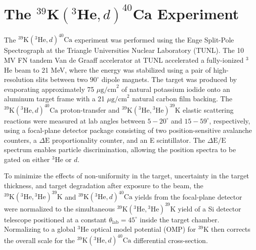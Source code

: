 \section{The $^{39}\mathrm{\textbf{K}}(^{3}\mathrm{\textbf{He}},d)^{40}\mathrm{\textbf{Ca}}$ Experiment}










The $^{39}\mathrm{K}(^{3}\mathrm{He}, d)^{40}\mathrm{Ca}$ experiment was performed using the Enge Split-Pole Spectrograph at the Triangle Universities Nuclear Laboratory (TUNL). The 10 MV FN tandem Van de Graaff accelerator at TUNL accelerated a fully-ionized $^{3}$He beam to 21 MeV, where the energy was stabilized using a pair of high-resolution slits between two $90^{\circ}$ dipole magnets. The target was produced by evaporating approximately 75 $\mu\mathrm{g/cm}^{2}$ of natural potassium iodide onto an aluminum target frame with a 21 $\mu\mathrm{g/cm}^{2}$ natural carbon film backing. The $^{39}\mathrm{K}(^{3}\mathrm{He}, d)^{40}\mathrm{Ca}$ proton-transfer and $^{39}\mathrm{K}(^{3}\mathrm{He}, {}^{3}\mathrm{He})^{39}\mathrm{K}$ elastic scattering reactions were measured at lab angles between $5-20^{\circ}$ and $15-59^{\circ}$, respectively, using a focal-plane detector package \cite{Marshall2019} consisting of two position-sensitive avalanche counters, a $\Delta\mathrm{E}$ proportionality counter, and an E scintillator. The $\Delta\mathrm{E}/\mathrm{E}$ spectrum enables particle discrimination, allowing the position spectra to be gated on either $^{3}\mathrm{He}$ or $d$.

To minimize the effects of non-uniformity in the target, uncertainty in the target thickness, and target degradation after exposure to the beam, the $^{39}\mathrm{K}(^{3}\mathrm{He}, {}^{3}\mathrm{He})^{39}\mathrm{K}$ and $^{39}\mathrm{K}(^{3}\mathrm{He}, d)^{40}\mathrm{Ca}$ yields from the focal-plane detector were normalized to the simultaneous $^{39}\mathrm{K}(^{3}\mathrm{He}, {}^{3}\mathrm{He})^{39}\mathrm{K}$ yield of a Si detector telescope positioned at a constant $\theta_{\mathrm{lab}} = 45^{\circ}$ inside the target chamber. Normalizing to a global $^{3}\mathrm{He}$ optical model potential (OMP) for $^{39}\mathrm{K}$ then corrects the overall scale for the $^{39}\mathrm{K}(^{3}\mathrm{He}, d)^{40}\mathrm{Ca}$ differential cross-section.

